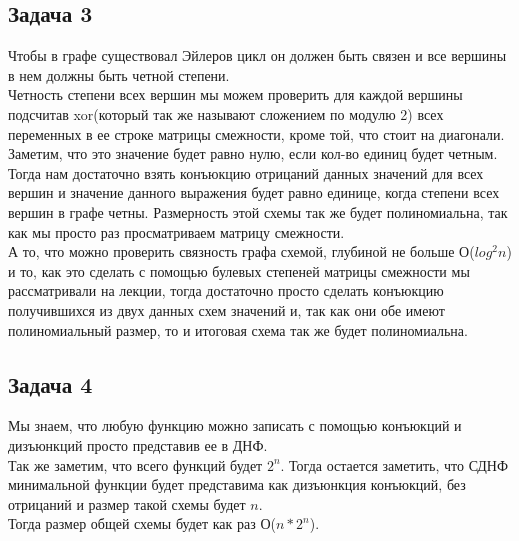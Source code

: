 	\subsection{Задача 3}
	Чтобы в графе существовал Эйлеров цикл он должен быть связен и все вершины в нем должны быть четной степени. \\
	Четность степени всех вершин мы можем проверить для каждой вершины подсчитав xor(который так же называют сложением по модулю 2) всех переменных в ее строке матрицы смежности, кроме той, что стоит на диагонали. Заметим, что это значение будет равно нулю, если кол-во единиц будет четным. Тогда нам достаточно взять конъюкцию отрицаний данных значений для всех вершин и значение данного выражения будет равно единице, когда степени всех вершин в графе четны. Размерность этой схемы так же будет полиномиальна, так как мы просто раз просматриваем матрицу смежности. \\
	А то, что можно проверить связность графа схемой, глубиной не больше О($log^2 n$) и то, как это сделать с помощью булевых степеней матрицы смежности мы рассматривали на лекции, тогда достаточно просто сделать конъюкцию получившихся из двух данных схем значений и, так как они обе имеют полиномиальный размер, то и итоговая схема так же будет полиномиальна. 
	
	\subsection{Задача 4}
	Мы знаем, что любую функцию можно записать с помощью конъюкций и дизъюнкций просто представив ее в ДНФ. \\
	Так же заметим, что всего функций будет $2^n$. Тогда остается заметить, что СДНФ минимальной функции  будет представима как дизъюнкция конъюкций, без отрицаний и размер такой схемы будет $n$. \\
	Тогда размер общей схемы будет как раз О($n*2^n$).
		
